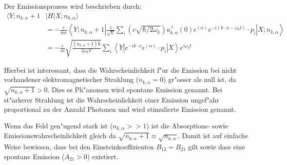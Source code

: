 Der Emissionsprozess wird beschrieben durch:
\begin{equation}
\begin{split}
\langle Y; n_{k,\alpha} + 1 &| H | X; n_{k,\alpha} \rangle \\
&= -\frac{e}{mc} \left\langle Y; n_{k,\alpha} + 1 \left| 
\frac{1}{\sqrt{V}} \sum_i \left(c \sqrt{\hbar/2 \omega_k}\right)a^+_{k,\alpha}(0) \epsilon^{(\alpha)} e^{-i(k \cdot x-\omega_k t)} \cdot p_i 
\right| X; n_{k,\alpha} \right\rangle\\
&= -\frac{e}{m} \sqrt{\frac{ (n_{k,\alpha}+1) \hbar}{2 \omega_k V}} \sum_i \left\langle Y \left| 
e^{-ik \cdot x} \epsilon^{(\alpha)} \cdot p_i 
\right| X \right\rangle e^{i\omega_k t}
\end{split}
\end{equation}

Hierbei ist interessant, dass die Wahrscheinlichkeit f"ur die Emission bei nicht vorhandener elektromagnetischer Strahlung ($n_{k,\alpha} = 0$) gr"osser als null ist, da $\sqrt{n_{k,\alpha}+1} > 0$. Dies es Ph"anomen wird spontane Emission genannt. Bei st"arkerer Strahlung ist die Wahrscheinlichkeit einer Emission ungef"ahr proportional zu der Anzahl Photonen und wird stimulierte Emission genannt.

Wenn das Feld gen"ugend stark ist ($n_{k,\alpha} >> 1$) ist die Absorptions- sowie Emissionswahrscheinlichkeit gleich da $\sqrt{n_{k,\alpha}+1} \approx \sqrt{n_{k,\alpha}}$. Damit ist auf einfache Weise bewiesen, dass bei den Einsteinkoeffizienten \cite{fq:einstein_koeff} $B_{12} = B_{21}$ gilt sowie dass eine spontane Emission ($A_{21} > 0$) existiert.